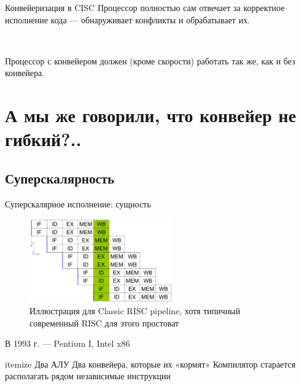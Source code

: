 \documentclass[xetex,aspectratio=43]{beamer}
\begin{document}
\begin{frame}{Конвейеризация в CISC}
    Процессор полностью сам отвечает за корректное исполнение кода --- обнаруживает конфликты и обрабатывает их.

    ~

    Процессор с конвейером должен (кроме скорости) работать так же, как и без конвейера.
\end{frame}

\section{А мы же говорили, что конвейер не гибкий?..}

\subsection{Суперскалярность}

\begin{frame}{Суперскалярное исполнение: сущность}
    \begin{figure}
        \includegraphics[width=0.55\textwidth]{img/11.superscalar_pipeline.pdf}
        \caption{Иллюстрация для Classic RISC pipeline, хотя типичный современный RISC для этого простоват}
    \end{figure}

    \pause

    В 1993 г. — Pentium I, Intel x86

    \begin{outline}{itemize}
        \1 Два АЛУ
        \1 Два конвейера, которые их «кормят»
        \1 Компилятор старается располагать рядом независимые инструкции
    \end{outline}

\end{frame}
\end{document}
